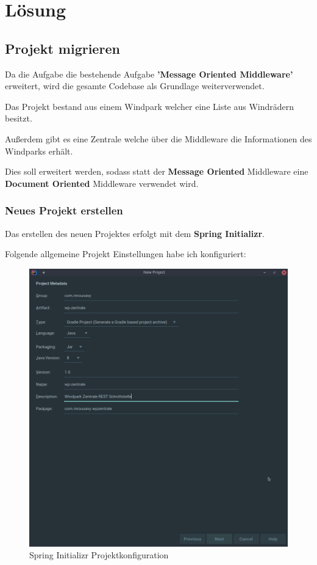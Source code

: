 
\section{Lösung}

\subsection{Projekt migrieren}

Da die Aufgabe die bestehende Aufgabe \textbf{'Message Oriented Middleware'} erweitert, wird die gesamte Codebase als Grundlage weiterverwendet.

Das Projekt bestand aus einem Windpark welcher eine Liste aus Windrädern besitzt.

Außerdem gibt es eine Zentrale welche über die Middleware die Informationen des Windparks erhält.

Dies soll erweitert werden, sodass statt der \textbf{Message Oriented} Middleware eine \textbf{Document Oriented} Middleware verwendet wird.

\clearpage
\subsubsection{Neues Projekt erstellen}

Das erstellen des neuen Projektes erfolgt mit dem \textbf{Spring Initializr}.

Folgende allgemeine Projekt Einstellungen habe ich konfiguriert:

\begin{figure}
    \caption{Spring Initializr Projektkonfiguration}
    \includegraphics[width=15cm]{images/initializr-general}
    \centering
\end{figure}


